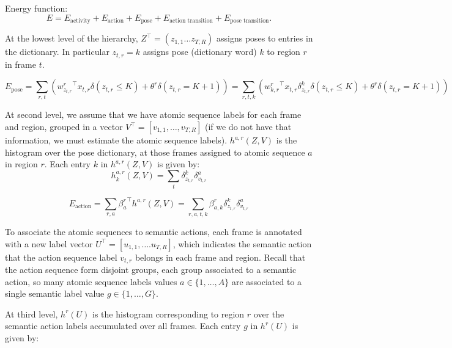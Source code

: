 \documentclass[10pt,letterpaper]{article}
\newcommand{\+}[1]{\ensuremath{{\boldsymbol #1}}}
\begin{document}
Energy function:
\begin{equation}
E = E_{\text{activity}} + E_{\text{action}} + E_{\text{pose}}
  + E_{\text{action transition}} + E_{\text{pose transition}}.
\end{equation}

At the lowest level of the hierarchy, $Z^\top = (z_{1,1} \dots
z_{T,R})$ assigns poses to entries in the
dictionary. In particular $z_{t,r}=k$ assigns pose (dictionary word) $k$ to
region $r$ in frame $t$. 

\begin{equation}
E_{\text{pose}} = \sum_{r,t} ({w^r_{z_{t,r}}}^\top x_{t,r}\delta(z_{t,r}\le K) + \theta^r\delta(z_{t,r}=K+1))= \sum_{r,t,k} ({w^r_{k,r}}^\top x_{t,r} \delta_{z_{t,r}}^k\delta(z_{t,r} \le K)+\theta^r\delta(z_{t,r}=K+1)) 
\end{equation}



At second level, we assume that we have atomic sequence labels for each frame and region, grouped in a vector $V^\top = [v_{1,1},\dots,v_{T,R}]$  (if we do not have that information, we must estimate the atomic sequence labels).
$h^{a,r}(Z, V)$ is the histogram over the pose
dictionary, at those frames assigned to atomic sequence $a$ in region $r$.
Each entry $k$ in
$h^{a,r}(Z,V)$ is given by:
\begin{equation}
\label{eq:histogram_poses_actions}
h_{k}^{a,r}(Z, V) =  \sum_{t} \delta_{z_{t,r}}^k \delta_{v_{t,r}}^a
\end{equation}

\begin{equation}
E_{\text{action}} = \sum_{r,a} {\beta^r_{a}}^\top h^{a,r}(Z, V) = \sum_{r,a,t,k} \beta^r_{a,k} \delta_{z_{t,r}}^k \delta_{v_{t,r}}^a
\end{equation}

To associate the atomic sequences to semantic actions, each frame is annotated with a new label vector $U^\top = [u_{1,1},\dots.u_{T,R}]$, which indicates the semantic action that the action sequence label $v_{t,r}$ belongs in each frame and region. Recall that  the action sequence form disjoint groups, each group associated to a semantic action, so many atomic sequence labels values $a \in \{1,\dots,A\}$ are associated to a single semantic label value $g \in \{1,\dots,G\}$.
\vspace{1em}

At third level, $h^{r}(U)$ is the histogram corresponding to region $r$ over
the semantic action labels accumulated over all frames. Each entry $g$ in $h^{r}(U)$ is
given by:
\end{document}
